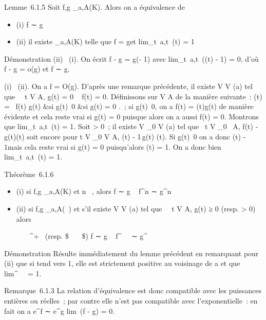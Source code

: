 \documentclass[]{article}
\begin{document}
Lemme~6.1.5 Soit f,g _a,A(K). Alors on a équivalence de

\begin{itemize}
\itemsep1pt\parskip0pt
\item
  (i) f ∼ g
\item
  (ii) il existe \phi {}_a,A(K) telle que f = g\phi et
  lim_t\rightarrow~a,t\inA~\phi(t) = 1
\end{itemize}

Démonstration (ii) \rigtharrow~(i). On écrit f - g = g(\phi - 1) avec
lim_t\rightarrow~a,t\inA~(\phi(t) - 1) = 0, d'où f - g
= o(g) et f ∼ g.

(i) \rigtharrow~(ii). On a f = O(g). D'après une remarque précédente, il existe V \in
V (a) tel que \forall~~t \in V \bigcap A, g(t) = 0 \rigtharrow~ f(t) = 0.
Définissons \phi sur V \bigcap A de la manière suivante~: \phi(t) =
\left \ \cases  f(t)
\over g(t) &si g(t)\neq~0
 &si g(t) = 0  \right .~; si
g(t)\neq~0, on a f(t) = \phi(t)g(t) de manière
évidente et cela reste vrai si g(t) = 0 puisque alors on a aussi f(t) =
0. Montrons que lim_t\rightarrow~a,t\inA~\phi(t) = 1.
Soit \epsilon \textgreater{} 0~; il existe V _0 \in V (a) tel que
\forall~t \in V _0~ \bigcap A, f(t) -
g(t)\leq \epsilong(t) soit encore pour t \in V
_0 \bigcap V \bigcap A, \phi(t) -
1\,g(t)\leq
\epsilong(t). Si g(t)\neq~0 on a
donc \phi(t) - 1\leq \epsilon mais cela reste vrai si g(t) = 0
puisqu'alors \phi(t) = 1. On a donc bien
lim_t\rightarrow~a,t\inA~\phi(t) = 1.

Théorème~6.1.6

\begin{itemize}
\item
  (i) si f,g _a,A(K) et n \in {}~, alors f ∼ g \rigtharrow~ f^n ∼
  g^n
\item
  (ii) si f,g _a,A(~) et s'il existe V \in V (a) tel que
  \forall~~t \in V \bigcap A, g(t) ≥ 0 (resp. \textgreater{}
  0) alors

  \forall~\alpha~ \in {}~^+~\text
  (resp. \$\forall~\alpha~ \in {}~\$) f ∼ g \rigtharrow~ f^\alpha~~
  ∼ g^\alpha~
\end{itemize}

Démonstration Résulte immédiatement du lemme précédent en remarquant
pour (ii) que si \phi tend vers 1, elle est strictement positive au
voisinage de a et que lim\phi^\alpha~~ = 1.

Remarque~6.1.3 La relation d'équivalence est donc compatible avec les
puissances entières ou réelles~; par contre elle n'est pas compatible
avec l'exponentielle~: en fait on a e^f ∼ e^g
\Leftrightarrow lim~(f - g) = 0.
\end{document}
